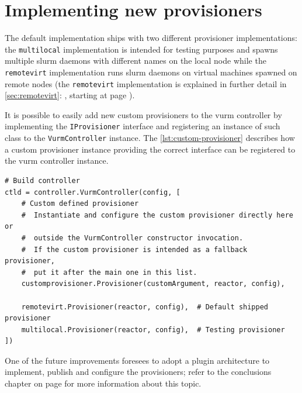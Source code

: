 \section{Implementing new provisioners}
\label{sec:new-provisioners}

The default implementation ships with two different provisioner implementations: the \texttt{multilocal} implementation is intended for testing purposes and spawns multiple \gls{slurm} daemons with different names on the local node while the \texttt{remotevirt} implementation runs \gls{slurm} daemons on virtual machines spawned on remote nodes (the \texttt{remotevirt} implementation is explained in further detail in \autoref{sec:remotevirt}: \emph{}, starting at page \pageref{sec:remotevirt}).

It is possible to easily add new custom provisioners to the \gls{vurm} controller by implementing the \texttt{IProvisioner} interface and registering an instance of such class to the \texttt{VurmController} instance. The \autoref{lst:custom-provisioner} describes how a custom provisioner instance providing the correct interface can be registered to the \gls{vurm} controller instance.

\begin{lstlisting}
# Build controller
ctld = controller.VurmController(config, [
    # Custom defined provisioner
    #  Instantiate and configure the custom provisioner directly here or
    #  outside the VurmController constructor invocation.
    #  If the custom provisioner is intended as a fallback provisioner,
    #  put it after the main one in this list.
    customprovisioner.Provisioner(customArgument, reactor, config),

    remotevirt.Provisioner(reactor, config),  # Default shipped provisioner
    multilocal.Provisioner(reactor, config),  # Testing provisioner
])
\end{lstlisting}
\lstset{firstnumber=1}

One of the future improvements foresees to adopt a plugin architecture to implement, publish and configure the provisioners; refer to the conclusions chapter on page \pageref{sec:future} for more information about this topic.

